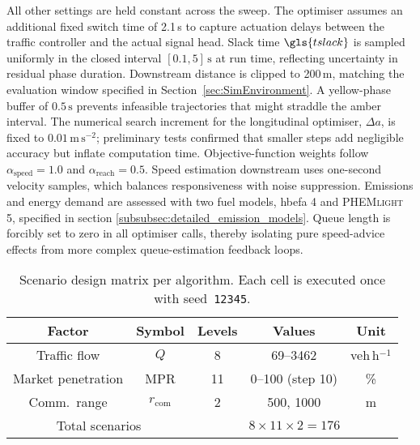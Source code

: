 All other settings are held constant across the sweep. The optimiser assumes an additional fixed switch time of 2.1\,s to capture actuation delays between the traffic controller and the actual signal head. Slack time \(\gls{tslack}\) is sampled uniformly in the closed interval \([0.1,5]\,\mathrm{s}\) at run time, reflecting uncertainty in residual phase duration. Downstream distance is clipped to 200\,m, matching the evaluation window specified in Section~\ref{sec:SimEnvironment}. A yellow-phase buffer of \(0.5\,\mathrm{s}\) prevents infeasible trajectories that might straddle the amber interval. The numerical search increment for the longitudinal optimiser, \(\Delta a\), is fixed to \(0.01\,\mathrm{m\,s^{-2}}\); preliminary tests confirmed that smaller steps add negligible accuracy but inflate computation time. Objective-function weights follow \(\alpha_{\text{speed}}=1.0\) and \(\alpha_{\text{reach}}=0.5\). Speed estimation downstream uses one-second velocity samples, which balances responsiveness with noise suppression.
\mynewline
Emissions and energy demand are assessed with two fuel models, \ac{hbefa} 4 and \textsc{PHEMlight} 5, specified in section \ref{subsubsec:detailed_emission_models}. Queue length is forcibly set to zero in all optimiser calls, thereby isolating pure speed-advice effects from more complex queue-estimation feedback loops.

\begin{table}[tbp]
  \centering
  \caption{Scenario design matrix per algorithm.  Each cell is executed once with seed~\texttt{12345}.}
  \label{tab:ScenarioMatrix}
  \begin{tabular}{ccccc}
    \toprule
    Factor & Symbol & Levels & Values & Unit \\
    \midrule
    Traffic flow & \(Q\) & 8 & 69–3462 & veh\,h\(^{-1}\) \\
    Market penetration & MPR & 11 & 0–100 (step 10) & \% \\
    Comm.\ range & \(r_{\text{com}}\) & 2 & 500, 1000 & m \\
    \midrule
    \multicolumn{2}{c}{Total scenarios} & \multicolumn{3}{c}{\(8\times11\times2=176\)}\\
    \bottomrule
  \end{tabular}
\end{table}

